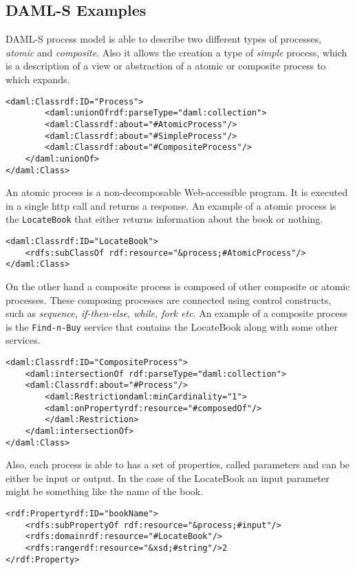 \subsection*{DAML-S Examples}
DAML-S process model is able to describe two different types of processes, \emph{atomic} and \emph{composite}. Also it allows the creation a type of \emph{simple} process, which is a description of a view or abstraction of a atomic or composite process to which expands.

\begin{lstlisting}
<daml:Classrdf:ID="Process">
        <daml:unionOfrdf:parseType="daml:collection">
        <daml:Classrdf:about="#AtomicProcess"/>
        <daml:Classrdf:about="#SimpleProcess"/>
        <daml:Classrdf:about="#CompositeProcess"/>
    </daml:unionOf>
</daml:Class>
\end{lstlisting}

An atomic process is a non-decomposable Web-accessible program. It is executed in a single http
call and returns a response. An example of a atomic process is the {\tt LocateBook} that either
returns information about the book or nothing.
\begin{lstlisting}
<daml:Classrdf:ID="LocateBook">
    <rdfs:subClassOf rdf:resource="&process;#AtomicProcess"/>
</daml:Class>
\end{lstlisting}

On the other hand a composite process is composed of other composite or atomic processes. These
composing processes are connected using control constructs, such as \emph{sequence, if-then-else,
while, fork etc}. An example of a composite process is the {\tt Find-n-Buy} service that contains
the LocateBook along with some other services.

\begin{lstlisting}
<daml:Classrdf:ID="CompositeProcess">
    <daml:intersectionOf rdf:parseType="daml:collection">
	<daml:Classrdf:about="#Process"/>
	    <daml:Restrictiondaml:minCardinality="1">
		<daml:onPropertyrdf:resource="#composedOf"/>
	    </daml:Restriction>
    </daml:intersectionOf>
</daml:Class>
\end{lstlisting}

Also, each process is able to has a set of properties, called parameters and can be either be input or output. In the case of the LocateBook an input parameter might be something like the name of the book.

\begin{lstlisting}
<rdf:Propertyrdf:ID="bookName">
    <rdfs:subPropertyOf rdf:resource="&process;#input"/>
    <rdfs:domainrdf:resource="#LocateBook"/>
    <rdfs:rangerdf:resource="&xsd;#string"/>2
</rdf:Property>
\end{lstlisting}

